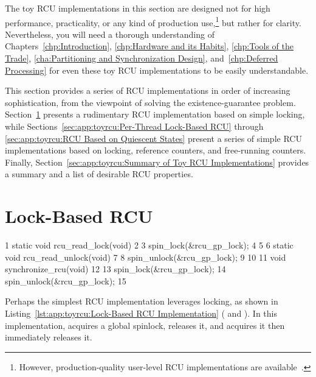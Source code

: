 

The toy RCU implementations in this section are designed not for
high performance, practicality, or any kind of production use,\footnote{
	However, production-quality user-level RCU implementations
	are available~\cite{MathieuDesnoyers2009URCU,MathieuDesnoyers2012URCU}.}
but rather for clarity.
Nevertheless, you will need a thorough understanding of
Chapters~\ref{chp:Introduction},
\ref{chp:Hardware and its Habits},
\ref{chp:Tools of the Trade},
\ref{cha:Partitioning and Synchronization Design},
and~\ref{chp:Deferred Processing}
for even these toy RCU implementations to be easily understandable.

This section provides a series of RCU implementations in order of
increasing sophistication, from the viewpoint of solving the
existence-guarantee problem.
Section~\ref{sec:app:toyrcu:Lock-Based RCU} presents a rudimentary
RCU implementation based on simple locking, while
Sections~\ref{sec:app:toyrcu:Per-Thread Lock-Based RCU} through
\ref{sec:app:toyrcu:RCU Based on Quiescent States}
present a series of
simple RCU implementations based on locking, reference counters,
and free-running counters.
Finally, Section~\ref{sec:app:toyrcu:Summary of Toy RCU Implementations}
provides a summary and a list of desirable RCU properties.

\section{Lock-Based RCU}
\label{sec:app:toyrcu:Lock-Based RCU}

\begin{listing}[bp]
{ \scriptsize
\begin{verbbox}
  1 static void rcu_read_lock(void)
  2 {
  3   spin_lock(&rcu_gp_lock);
  4 }
  5
  6 static void rcu_read_unlock(void)
  7 {
  8   spin_unlock(&rcu_gp_lock);
  9 }
 10
 11 void synchronize_rcu(void)
 12 {
 13   spin_lock(&rcu_gp_lock);
 14   spin_unlock(&rcu_gp_lock);
 15 }
\end{verbbox}
}
\centering
\theverbbox
\caption{Lock-Based RCU Implementation}
\label{lst:app:toyrcu:Lock-Based RCU Implementation}
\end{listing}

Perhaps the simplest RCU implementation leverages locking, as
shown in
Listing~\ref{lst:app:toyrcu:Lock-Based RCU Implementation}
( and ).
In this implementation,  acquires a global
spinlock,  releases it, and
 acquires it then immediately releases it.


